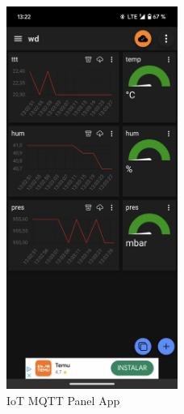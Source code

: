 \documentclass[titlepage]{article}
\begin{document}
\begin{figure}[ht]
    \begin{minipage}{0.48\textwidth}
        \centering
        \includegraphics[width=0.5\textwidth]{img/App-IoT.png}
        \caption{IoT MQTT Panel App}
        \label{fig:app-iot}
    \end{minipage}
    \hfill
    \begin{minipage}{0.48\textwidth}
        \centering

\end{minipage}
\end{figure}
\end{document}
